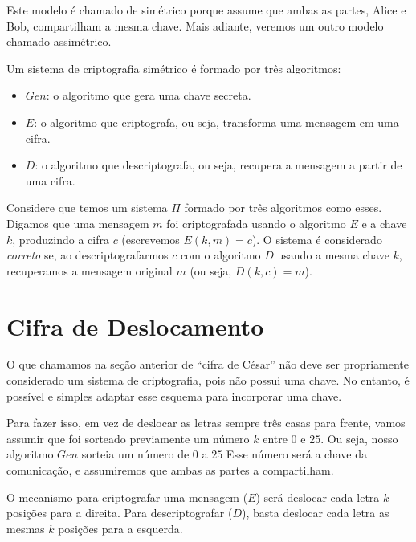 Este modelo é chamado de simétrico porque assume que ambas as partes, Alice e Bob, compartilham a mesma chave.
Mais adiante, veremos um outro modelo chamado assimétrico.

Um sistema de criptografia simétrico é formado por três algoritmos:
\begin{itemize}
\item $Gen$: o algoritmo que gera uma chave secreta.
\item $E$: o algoritmo que criptografa, ou seja, transforma uma mensagem em uma cifra.
\item $D$: o algoritmo que descriptografa, ou seja, recupera a mensagem a partir de uma cifra.
\end{itemize}

Considere que temos um sistema $\Pi$ formado por três algoritmos como esses.
Digamos que uma mensagem $m$ foi criptografada usando o algoritmo $E$ e a chave $k$, produzindo a cifra $c$ (escrevemos $E(k,m) = c$).
O sistema é considerado {\em correto} se, ao descriptografarmos $c$ com o algoritmo $D$ usando a mesma chave $k$, recuperamos a mensagem original $m$ (ou seja, $D(k,c) = m$).

\section{Cifra de Deslocamento}
\label{sec:cifra-deslocamento}

O que chamamos na seção anterior de ``cifra de César'' não deve ser propriamente considerado um sistema de criptografia, pois não possui uma chave.
No entanto, é possível e simples adaptar esse esquema para incorporar uma chave.

Para fazer isso, em vez de deslocar as letras sempre três casas para frente, vamos assumir que foi sorteado previamente um número $k$ entre $0$ e $25$.
Ou seja, nosso algoritmo $Gen$ sorteia um número de $0$ a $25$
Esse número será a chave da comunicação, e assumiremos que ambas as partes a compartilham.

O mecanismo para criptografar uma mensagem ($E$) será deslocar cada letra $k$ posições para a direita.
Para descriptografar ($D$), basta deslocar cada letra as mesmas $k$ posições para a esquerda.

